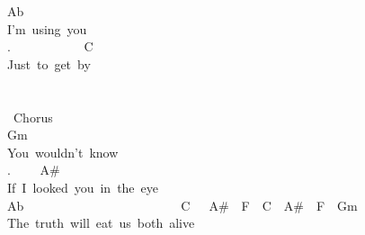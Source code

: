 {Ab\\
I'm\ using\ you\\
. \ \ \ \ \ \ \ \ \ \ \ C\\
Just\ to\ get\ by\\
\\
\\
\lbrack\ Chorus\rbrack\\
Gm\\
You\ wouldn't\ know\\
. \ \ \ \ A\#\\
If\ I\ looked\ you\ in\ the\ eye\\
Ab\ \ \ \ \ \ \ \ \ \ \ \ \ \ \ \ \ \ \ \ \ \ \ \ \ C\ \ \ A\#\ \ F\ \ C\ \ A\#\ \ F\ \ Gm\\
The\ truth\ will\ eat\ us\ both\ alive\ }
